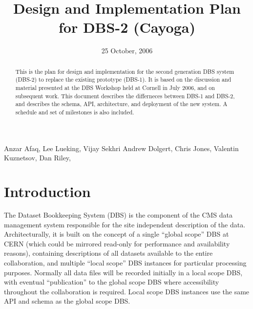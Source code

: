 \documentclass{cmspaper}
\begin{document}

\begin{titlepage}

   \date{25 October, 2006}

  \title{Design and Implementation Plan for DBS-2 (Cayoga)}

  \begin{Authlist}
  Anzar Afaq,  Lee Lueking,  Vijay Sekhri     
Andrew Dolgert,  Chris Jones,  Valentin Kuznetsov, Dan Riley,

  \end{Authlist}



  \begin{abstract}
    This is the plan for design and implementation for the second generation DBS system (DBS-2) to replace the existing prototype (DBS-1). It is based on the discussion and material presented at the DBS Workshop held at Cornell in July 2006, and on subsequent work. This document describes the differneces between DBS-1 and DBS-2, and describes the schema, API, architecture, and deployment of the new system. A schedule and set of milestones is also included.
 
  \end{abstract} 
  
\end{titlepage}

\setcounter{page}{2}%


%

\section{Introduction}

The Dataset Bookkeeping System (DBS) is the component of the CMS data
management system responsible for the site independent description of
the data.  Architecturally, it is built on the concept of a single
``global scope'' DBS at CERN (which could be mirrored read-only for
performance and availability reasons), containing descriptions of all
datasets available to the entire collaboration, and multiple ``local
scope'' DBS instances for particular processing purposes.  Normally
all data files will be recorded initially in a local scope DBS, with
eventual ``publication'' to the global scope DBS where accessibility
throughout the collaboration is required.  Local scope DBS instances
use the same API and schema as the global scope DBS.
\end{document}
